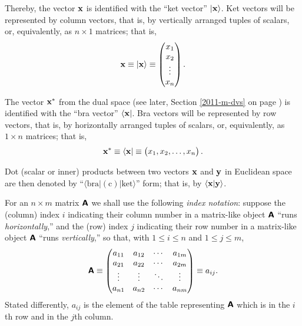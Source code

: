 Thereby,
the vector ${\bf x}$ is identified with the ``ket vector'' $\vert {\bf x}\rangle$.
Ket vectors will be represented by column vectors, that is, by vertically arranged tuples of scalars,
or, equivalently, as $n \times 1$ matrices; that is,
\begin{equation}
{\bf x}
\equiv
\vert {\bf x}\rangle
\equiv
\begin{pmatrix}
x_1\\
x_2\\
\vdots \\
x_n
\end{pmatrix}
.
\end{equation}


The vector ${\bf x}^\ast$  from the dual space (see later, Section \ref{2011-m-dvs} on page \pageref{2011-m-dvs})
 is identified with the ``bra vector'' $\langle {\bf x}\vert$.
Bra vectors will be represented by row vectors, that is, by horizontally arranged tuples of scalars,
or, equivalently, as $1 \times n$ matrices; that is,
\begin{equation}
{\bf x}^\ast
\equiv
\langle {\bf x}   \vert
\equiv
\begin{pmatrix}
x_1,
x_2,
\ldots ,
x_n
\end{pmatrix}
.
\end{equation}



Dot (scalar or inner) products between two vectors ${\bf x}$ and ${\bf y}$   in Euclidean space are then
denoted by ``$\langle \textrm{bra} \vert  (\textrm{c}) \vert \textrm{ket}  \rangle$''  form;
that is, by $\langle {\bf x} \vert  {\bf y}  \rangle$.




For an $n \times m$ matrix $\textsf{\textbf{A}}$ we shall use the following {\em index notation}:
suppose the (column) index $i$  indicating their column number in a matrix-like object $\textsf{\textbf{A}}$ ``runs {\em horizontally},''
and
the (row) index $j$  indicating their row number in a matrix-like object  $\textsf{\textbf{A}}$ ``runs {\em vertically},''
so that, with
$1 \le i \le n$ and
$1 \le j \le m$,
\begin{equation}
\textsf{\textbf{A}}
\equiv
\begin{pmatrix}
a_{11}&a_{12}& \cdots & a_{1m}\\
a_{21}&a_{22}& \cdots & a_{2m}\\
\vdots &\vdots & \ddots & \vdots \\
a_{n1}&a_{n2}& \cdots & a_{nm}
\end{pmatrix}
\equiv a_{ij}
.
\label{2016-m-ch-fdvs-matrixind}
\end{equation}
Stated differently, $a_{ij}$ is the element  of the table representing $\textsf{\textbf{A}}$ which is in the $i$th row and in the $j$th column.

